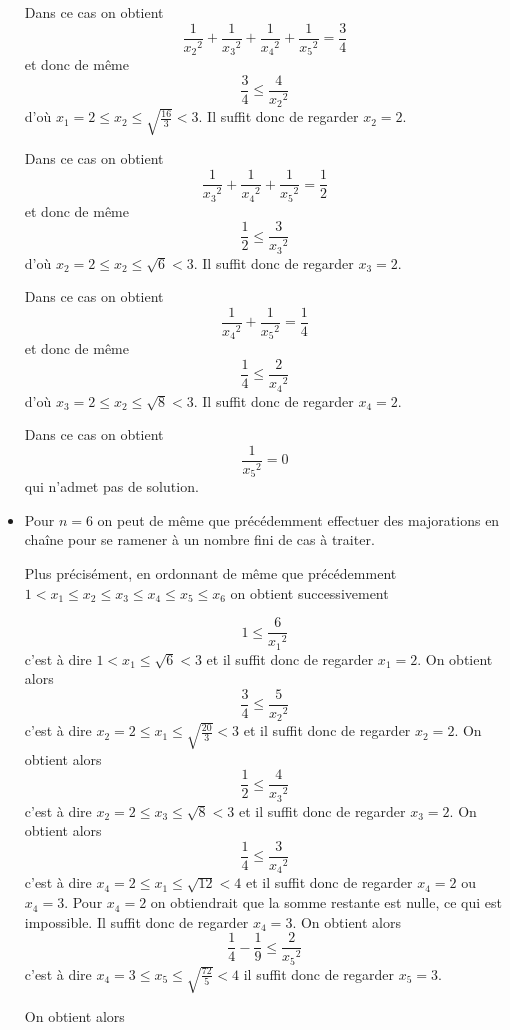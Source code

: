 \begin{sol}
\begin{itemize}
          Dans ce cas on obtient
          \[\frac{1}{{x_2}^2} + \frac{1}{{x_3}^2} + \frac{1}{{x_4}^2} + \frac{1}{{x_5}^2} = \frac{3}{4}\]
          et donc de même
          \[\frac{3}{4} \leq \frac{4}{{x_2}^2}\]
          d'où $x_1 =2 \leq x_2 \leq \sqrt{\frac{16}{3}} < 3$. Il suffit donc de regarder $x_2 = 2$.

          Dans ce cas on obtient
          \[\frac{1}{{x_3}^2} + \frac{1}{{x_4}^2} + \frac{1}{{x_5}^2} = \frac{1}{2}\]
          et donc de même
          \[\frac{1}{2} \leq \frac{3}{{x_3}^2}\]
          d'où $x_2 =2 \leq x_2 \leq \sqrt{6} < 3$. Il suffit donc de regarder $x_3 = 2$.

          Dans ce cas on obtient
          \[\frac{1}{{x_4}^2} + \frac{1}{{x_5}^2} = \frac{1}{4}\]
          et donc de même
          \[\frac{1}{4} \leq \frac{2}{{x_4}^2}\]
          d'où $x_3 =2 \leq x_2 \leq \sqrt{8} < 3$. Il suffit donc de regarder $x_4 = 2$.

          Dans ce cas on obtient
          \[\frac{1}{{x_5}^2} = 0\]
          qui n'admet pas de solution.

    \item Pour $n=6$ on peut de même que précédemment effectuer des majorations en chaîne pour se ramener à un nombre fini de cas à traiter.

          Plus précisément, en ordonnant de même que précédemment $1 < x_1 \leq x_2 \leq x_3 \leq x_4 \leq x_5 \leq x_6$ on obtient successivement

          \[1 \leq \frac{6}{{x_1}^2}\]
          c'est à dire $1 < x_1 \leq \sqrt{6} < 3$ et il suffit donc de regarder $x_1 = 2$. On obtient alors
          \[\frac{3}{4} \leq \frac{5}{{x_2}^2}\]
          c'est à dire $x_2 = 2 \leq x_1 \leq \sqrt{\frac{20}{3}} < 3$ et il suffit donc de regarder $x_2 = 2$. On obtient alors
          \[\frac{1}{2} \leq \frac{4}{{x_3}^2}\]
          c'est à dire $x_2 = 2 \leq x_3 \leq \sqrt{8} < 3$ et il suffit donc de regarder $x_3 = 2$. On obtient alors
          \[\frac{1}{4} \leq \frac{3}{{x_4}^2}\]
          c'est à dire $x_4 = 2 \leq x_1 \leq \sqrt{12} < 4$ et il suffit donc de regarder $x_4 = 2$ ou $x_4=3$. Pour $x_4 = 2$ on obtiendrait que la somme restante est nulle, ce qui est impossible. Il suffit donc de regarder $x_4 =3$. On obtient alors
          \[\frac{1}{4}-\frac{1}{9} \leq \frac{2}{{x_5}^2}\]
          c'est à dire $x_4 = 3 \leq x_5 \leq \sqrt{\frac{72}{5}} < 4$ il suffit donc de regarder $x_5 = 3$.

          On obtient alors


\end{itemize}
\end{sol}
